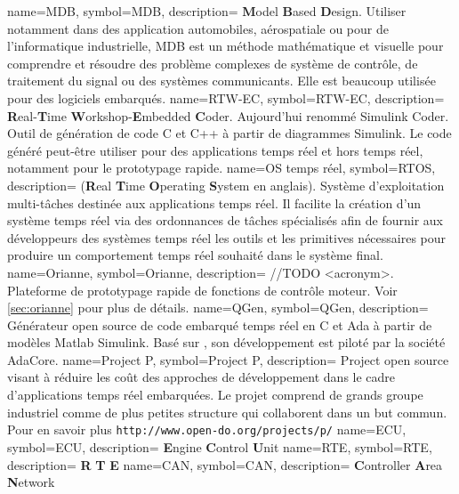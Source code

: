   {
	name=MDB,
	symbol=MDB,
	description=
	{
	  {\bf M}odel {\bf B}ased {\bf D}esign. Utiliser notamment dans des application
	  automobiles, aérospatiale ou pour de l'informatique industrielle, MDB est un
	  méthode mathématique et visuelle pour comprendre et résoudre des problème
	   complexes de système de contrôle, de traitement du signal ou des systèmes
	   communicants. Elle est beaucoup utilisée pour des logiciels embarqués.
	}
}
  {
	name=RTW-EC\up{\circledR},
	symbol=RTW-EC\up{\circledR},
	description=
	{
	  {\bf R}eal-{\bf T}ime {\bf W}orkshop-{\bf E}mbedded {\bf C}oder\up{\circledR}.
	  Aujourd'hui renommé Simulink Coder\up{\texttrademark}. Outil de génération de code
	  C et C++ à partir de diagrammes Simulink\up{\circledR}. Le code généré peut-être
	  utiliser pour des applications temps réel et hors temps réel, notamment pour le
	  prototypage rapide.
	}
}
  {
	name=OS temps réel,
	symbol=RTOS,
	description=
	{
	  ({\bf R}eal {\bf T}ime {\bf O}perating {\bf S}ystem en anglais). Système d'exploitation
	  multi-tâches destinée aux applications temps réel. Il facilite la création d'un système
	  temps réel via des ordonnances de tâches spécialisés afin de fournir aux développeurs
	  des systèmes temps réel les outils et les primitives nécessaires pour produire un
	  comportement temps réel souhaité dans le système final.
	}
}
  {
	name=Orianne,
	symbol=Orianne,
	description=
	{
	  //TODO <acronym>. Plateforme de prototypage rapide de fonctions de contrôle moteur. Voir \ref{sec:orianne} pour plus de détails.
	}
}
  {
	name=QGen,
	symbol=QGen,
	description=
	{
	  Générateur open source de code embarqué temps réel en C et Ada à partir de modèles
	  Matlab\up{\textregistered} Simulink\up{\textregistered}. Basé sur
	  , son développement est piloté par la société AdaCore.
	}
}
  {
	name=Project P,
	symbol=Project P,
	description=
	{
	  Project open source visant à réduire les coût des approches de
	  développement  dans le cadre d'applications temps réel
	  embarquées. Le projet comprend de grands groupe industriel comme de plus
	  petites structure qui collaborent dans un but commun. Pour en savoir plus
	  {\tt http://www.open-do.org/projects/p/}
	}
}
  {
	name=ECU,
	symbol=ECU,
	description=
	{
	  {\bf E}ngine {\bf C}ontrol {\bf U}nit
	}
}
  {
	name=RTE,
	symbol=RTE,
	description=
	{
	  {\bf R} {\bf T} {\bf E}
	}
}
  {
	name=CAN,
	symbol=CAN,
	description=
	{
	  {\bf C}ontroller {\bf A}rea {\bf N}etwork
	}
}
